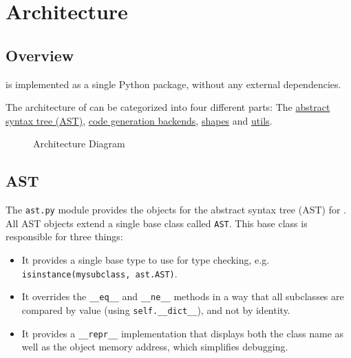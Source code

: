 
\chapter{Architecture}

\label{ch:architecture}


\section{Overview}\label{sec:overview}

\tangible{} is implemented as a single Python package, without any external
dependencies.

The architecture of \tangible{} can be categorized into four different parts: The
\hyperref[sec:ast]{abstract syntax tree (AST)}, \hyperref[sec:backends]{code
generation backends}, \hyperref[sec:shapes]{shapes} and
\hyperref[sec:utils]{utils}.

\vspace{7mm}

\begin{figure}[H]
	\centering
	
	\caption{Architecture Diagram}
	\label{img:architecture}
\end{figure}


\section{AST}\label{sec:ast}

The \texttt{ast.py} module provides the objects for the abstract syntax tree
(AST) for \tangible{}. All AST objects extend a single base class called
\texttt{AST}. This base class is responsible for three things:

\begin{itemize}
	\item It provides a single base type to use for type checking, e.g.
		\texttt{isinstance(mysubclass, ast.AST)}.
	\item It overrides the \texttt{\_\_eq\_\_} and \texttt{\_\_ne\_\_} methods in
		a way that all subclasses are compared by value (using
		\texttt{self.\_\_dict\_\_}), and not by identity.
	\item It provides a \texttt{\_\_repr\_\_} implementation that displays both
		the class name as well as the object memory address, which simplifies
		debugging.
\end{itemize}

